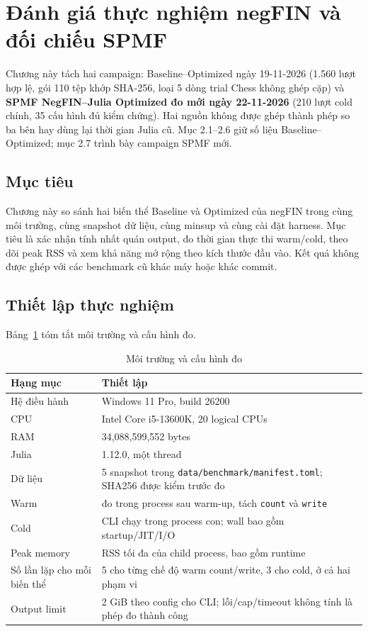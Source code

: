 \section{Đánh giá thực nghiệm negFIN và đối chiếu SPMF}\label{sec:ch2}

Chương này tách hai campaign: Baseline--Optimized ngày 19-11-2026 (1.560 lượt hợp lệ, gói 110 tệp khớp SHA-256, loại 5 dòng trial Chess không ghép cặp) và \textbf{SPMF NegFIN--Julia Optimized đo mới ngày 22-11-2026} (210 lượt cold chính, 35 cấu hình đủ kiểm chứng). Hai nguồn không được ghép thành phép so ba bên hay dùng lại thời gian Julia cũ. Mục 2.1--2.6 giữ số liệu Baseline--Optimized; mục 2.7 trình bày campaign SPMF mới.

\subsection{Mục tiêu}

Chương này so sánh hai biến thể Baseline và Optimized của negFIN trong cùng môi trường, cùng snapshot dữ liệu, cùng minsup và cùng cài đặt harness. Mục tiêu là xác nhận tính nhất quán output, đo thời gian thực thi warm/cold, theo dõi peak RSS và xem khả năng mở rộng theo kích thước đầu vào. Kết quả không được ghép với các benchmark cũ khác máy hoặc khác commit.

\subsection{Thiết lập thực nghiệm}

Bảng~\ref{tab:c2-I} tóm tắt môi trường và cấu hình đo.

\begin{table}[!t]
\centering\footnotesize
\caption{Môi trường và cấu hình đo}
\label{tab:c2-I}
\setlength{\tabcolsep}{4pt}
\begin{tabular}{ll}
\hline
\textbf{Hạng mục} & \textbf{Thiết lập} \\ \hline
Hệ điều hành & Windows 11 Pro, build 26200 \\
CPU & Intel Core i5-13600K, 20 logical CPUs \\
RAM & 34,088,599,552 bytes \\
Julia & 1.12.0, một thread \\
Dữ liệu & 5 snapshot trong \nolinkurl{data/benchmark/manifest.toml}; SHA256 được
kiểm trước đo \\
Warm & đo trong process sau warm-up, tách \texttt{count} và \texttt{write} \\
Cold & CLI chạy trong process con; wall bao gồm startup/JIT/I/O \\
Peak memory & RSS tối đa của child process, bao gồm runtime \\
Số lần lặp cho mỗi biến thể & 5 cho từng chế độ warm count/write, 3 cho cold, ở cả hai phạm vi \\
Output limit & 2 GiB theo config cho CLI; lỗi/cap/timeout không tính là phép đo thành
công \\
\hline
\end{tabular}
\end{table}

